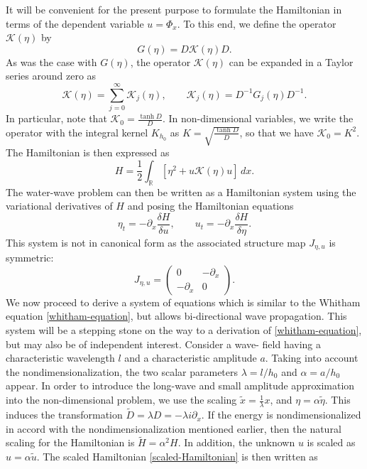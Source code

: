 It will be convenient for the present purpose to formulate the
Hamiltonian in terms of the dependent variable $u = \Phi_x$. To this
end, we define the operator $\mathcal{K} (\eta)$ by
%
\begin{equation*}
	G(\eta) = D \mathcal{K}(\eta) D
	.
\end{equation*}
%
As was the case with $G (\eta)$, the operator $\mathcal{K}(\eta)$ can be expanded in
a Taylor series around zero as
%
\[
	\mathcal{K}(\eta) = \sum_{j=0}^\infty \mathcal{K}_j(\eta)
	, \qquad
	\mathcal{K}_j(\eta) = D^{-1}G_j(\eta)D^{-1}
	.
\]
%
In particular, note that $\mathcal{K}_0 = \frac{\tanh D}{D}$. In non-dimensional variables, we write the operator with the integral kernel $K_{h_0}$ as $K = \sqrt{\frac{\tanh D}{D}}$, so that we have $\mathcal{K}_0 = K^2$. The Hamiltonian is then expressed as 
%
\begin{equation}
	H  = \frac{1}{2} \int_{\mathbb{R}} \left[ \eta^2 + u \mathcal{K}(\eta) u \right] \, dx.
\label{scaled-Hamiltonian}
\end{equation}
%
The water-wave problem can then be written as a Hamiltonian
system using the variational derivatives of $H$ and posing the
Hamiltonian equations
%
\begin{equation}
	\eta_t = - \partial_x \frac{\delta H}{\delta u}, \qquad u_t = -\partial_x \frac{\delta H}{\delta \eta}.
\end{equation}
%
This system is not in canonical form as the associated structure
map $J_{\eta, u}$ is symmetric:
%
\begin{equation}
	J_{\eta, u} =
	\begin{pmatrix}
		0 & -\partial_x
		\\
		-\partial_x & 0
	\end{pmatrix}.
\end{equation}
%
We now proceed to derive a system of equations which is similar to
the Whitham equation \eqref{whitham-equation}, but allows bi-directional wave propagation. This system will be a stepping stone on the way to a derivation
of \eqref{whitham-equation}, but may also be of independent interest. Consider a wave-
field having a characteristic wavelength $l$ and a characteristic amplitude $a$. Taking into account the nondimensionalization, the two
scalar parameters $\lambda = l / h_0$ and $ \alpha = a / h_0$ appear. In order to introduce the long-wave and small amplitude approximation into the
non-dimensional problem, we use the scaling $\tilde{x}= \frac{1}{\lambda} x$, and $ \eta = \alpha \tilde{\eta}$.
This induces the transformation $\tilde{D} = \lambda D = -\lambda i \partial_x $. If the energy
is nondimensionalized in accord with the nondimensionalization
mentioned earlier, then the natural scaling for the Hamiltonian is
$ \tilde{H}= \alpha^2 H$. In addition, the unknown $u$ is scaled as $u = \alpha \tilde{u}$. The
scaled Hamiltonian \eqref{scaled-Hamiltonian} is then written as
